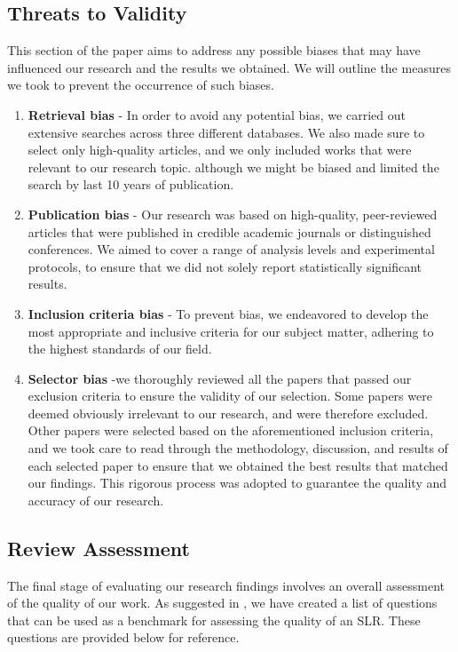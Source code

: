 \documentclass{svproc}
\begin{document}
\subsection{Threats to Validity}
This section of the paper aims to address any possible biases that may have influenced our research and the results we obtained. We will outline the measures we took to prevent the occurrence of such biases.\cite{A_NewParadigm_for_SystematicLiteratureReviews}

\begin{enumerate}
    \item \textbf{Retrieval bias} - In order to avoid any potential bias, we carried out extensive searches across three different databases. We also made sure to select only high-quality articles, and we only included works that were relevant to our research topic. although we might be biased and limited the search by last 10 years of publication.

    \item \textbf{Publication bias} - Our research was based on high-quality, peer-reviewed articles that were published in credible academic journals or distinguished conferences. We aimed to cover a range of analysis levels and experimental protocols, to ensure that we did not solely report statistically significant results.
    \item \textbf{Inclusion criteria bias} - To prevent bias, we endeavored to develop the most appropriate and inclusive criteria for our subject matter, adhering to the highest standards of our field.
    \item \textbf{Selector bias} -we thoroughly reviewed all the papers that passed our exclusion criteria to ensure the validity of our selection. Some papers were deemed obviously irrelevant to our research, and were therefore excluded. Other papers were selected based on the aforementioned inclusion criteria, and we took care to read through the methodology, discussion, and results of each selected paper to ensure that we obtained the best results that matched our findings. This rigorous process was adopted to guarantee the quality and accuracy of our research.
\end{enumerate}

\subsection{Review Assessment}
The final stage of evaluating our research findings involves an overall assessment of the quality of our work. As suggested in \cite{Procedures_for_PerformingSystematicReviews}, we have created a list of questions that can be used as a benchmark for assessing the quality of an SLR. These questions are provided below for reference.
\end{document}
